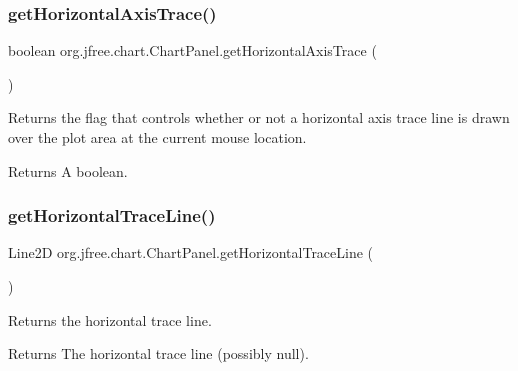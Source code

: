 \subsubsection{\texorpdfstring{get\+Horizontal\+Axis\+Trace()}{getHorizontalAxisTrace()}}
{\footnotesize\ttfamily boolean org.\+jfree.\+chart.\+Chart\+Panel.\+get\+Horizontal\+Axis\+Trace (\begin{DoxyParamCaption}{ }\end{DoxyParamCaption})}

Returns the flag that controls whether or not a horizontal axis trace line is drawn over the plot area at the current mouse location.

\begin{DoxyReturn}{Returns}
A boolean. 
\end{DoxyReturn}
\mbox{\label{classorg_1_1jfree_1_1chart_1_1_chart_panel_aae44b4bd954390305d39a58a96aa42ff}} 
\subsubsection{\texorpdfstring{get\+Horizontal\+Trace\+Line()}{getHorizontalTraceLine()}}
{\footnotesize\ttfamily Line2D org.\+jfree.\+chart.\+Chart\+Panel.\+get\+Horizontal\+Trace\+Line (\begin{DoxyParamCaption}{ }\end{DoxyParamCaption})\hspace{0.3cm}{\ttfamily [protected]}}

Returns the horizontal trace line.

\begin{DoxyReturn}{Returns}
The horizontal trace line (possibly {\ttfamily null}). 
\end{DoxyReturn}
\mbox{\label{classorg_1_1jfree_1_1chart_1_1_chart_panel_aabe90bcffc385f5bcb14b83757a2bc27}} 
